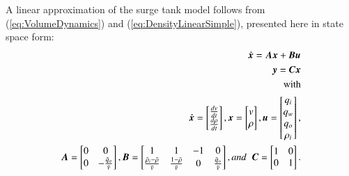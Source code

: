 \documentclass[preprint,authoryear,12pt]{elsarticle}
\begin{document}
A linear approximation of the surge tank model follows from (\ref{eq:VolumeDynamics}) and (\ref{eq:DensityLinearSimple}), presented here in state space form:
\begin{align}
	\begin{split}
	\boldsymbol{\dot{x}} = \boldsymbol{A}\boldsymbol{x} + \boldsymbol{B}\boldsymbol{u} \\
	\boldsymbol{y} = \boldsymbol{C}\boldsymbol{x}\\
	\text{with} \\
	\boldsymbol{\dot{x}} = \begin{bmatrix} \frac{dv}{dt} \\ \frac{d\rho}{dt} \end{bmatrix}, \boldsymbol{x} = \begin{bmatrix} v \\ \rho \end{bmatrix}, \boldsymbol{u} = \begin{bmatrix} q_i \\ q_w \\ q_o \\ \rho_i \end{bmatrix}, \\ 
	\boldsymbol{A} = \begin{bmatrix} 0 & 0 \\ 0 & -\frac{\bar{q}_o}{\bar{v}}  \end{bmatrix}, 
	\boldsymbol{B} = \begin{bmatrix} 1 & 1 & -1 & 0 \\ \frac{\bar{\rho}_i - \bar{\rho}}{\bar{v}} & \frac{1 - \bar{\rho}}{\bar{v}} & 0 & \frac{\bar{q}_o}{\bar{v}} \end{bmatrix}, and \hspace{2mm}
	\boldsymbol{C} = \begin{bmatrix} 1 & 0 \\ 0 & 1  \end{bmatrix}. \\
	\end{split}
	\label{eq:LinearModel}
\end{align}

\end{document}
